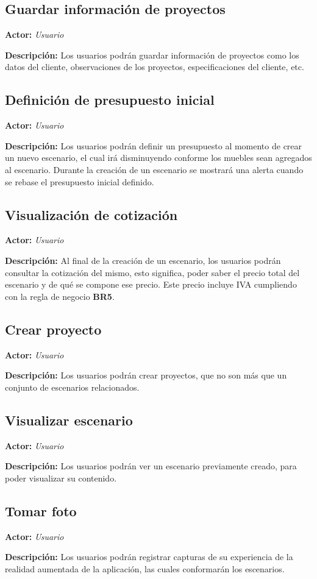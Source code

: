 \subsection{Guardar información de proyectos}
\textbf{Actor:} \textit{Usuario} \par
\textbf{Descripción:} Los usuarios podrán guardar información de proyectos como los datos del cliente, observaciones de los proyectos, especificaciones del cliente, etc.

\subsection{Definición de presupuesto inicial}
\textbf{Actor:} \textit{Usuario} \par
\textbf{Descripción:} Los usuarios podrán definir un presupuesto al momento de crear un nuevo escenario, el cual irá disminuyendo conforme los muebles sean agregados al escenario. Durante la creación de un escenario se mostrará una alerta cuando se rebase el presupuesto inicial definido.

\subsection{Visualización de cotización}
\textbf{Actor:} \textit{Usuario} \par
\textbf{Descripción:} Al final de la creación de un escenario, los usuarios podrán consultar la cotización del mismo, esto significa, poder saber el precio total del escenario y de qué se compone ese precio. Este precio incluye IVA cumpliendo con la regla de negocio \textbf{BR5}.

\subsection{Crear proyecto}
\textbf{Actor:} \textit{Usuario} \par
\textbf{Descripción:} Los usuarios podrán crear proyectos, que no son más que un conjunto de escenarios relacionados.

\subsection{Visualizar escenario}
\textbf{Actor:} \textit{Usuario} \par
\textbf{Descripción:} Los usuarios podrán ver un escenario previamente creado, para poder visualizar su contenido.

\subsection{Tomar foto}
\textbf{Actor:} \textit{Usuario} \par
\textbf{Descripción:} Los usuarios podrán registrar capturas de su experiencia de la realidad aumentada de la aplicación, las cuales conformarán los escenarios.

